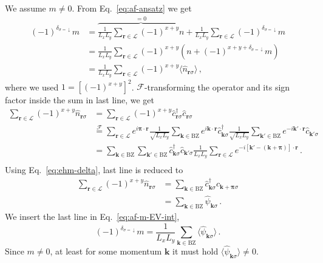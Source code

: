 \begin{tabproof}
	
	We assume $m \neq 0$. From Eq.~\eqref{eq:af-ansatz} we get
	\begin{align}
		(-1)^{\delta_{\sigma=\downarrow}} m &=  \overbrace{\frac{1}{L_x L_y} \sum_{\mathbf{r}\in\mathcal{L}} (-1)^{x+y} n}^{=0} + \frac{1}{L_x L_y} \sum_{\mathbf{r}\in\mathcal{L}} (-1)^{\delta_{\sigma=\downarrow}} m \nonumber \\
		&= \frac{1}{L_x L_y} \sum_{\mathbf{r}\in\mathcal{L}} (-1)^{x+y} \left(
		n + (-1)^{x+y+\delta_{\sigma=\downarrow}} m
		\right) \nonumber \\
		&= \frac{1}{L_x L_y} \sum_{\mathbf{r}\in\mathcal{L}} (-1)^{x+y} \langle \hat n_{\mathbf{r}\sigma} \rangle \, , \label{eq:af-m-EV-int}
	\end{align}
	where we used $1 = \left[(-1)^{x+y}\right]^2$. $\mathcal{F}$-transforming the operator and its sign factor inside the sum in last line, we get
	\[
	\begin{aligned}
		\sum_{\mathbf{r}\in\mathcal{L}} (-1)^{x+y} \hat n_{\mathbf{r}\sigma} &= \sum_{\mathbf{r}\in\mathcal{L}} (-1)^{x+y} \hat c_{\mathbf{r}\sigma}^\dagger \hat c_{\mathbf{r}\sigma} \\
		&\stackrel{\mathcal{F}}{=} \sum_{\mathbf{r}\in\mathcal{L}} e^{i \bm{\pi} \cdot \mathbf{r}}
		\frac{1}{\sqrt{L_x L_y}} \sum_{\mathbf{k} \in \mathrm{BZ}} e^{i \mathbf{k} \cdot \mathbf{r}} \hat c_{\mathbf{k}\sigma}^\dagger \frac{1}{\sqrt{L_x L_y}} \sum_{\mathbf{k}' \in \mathrm{BZ}} e^{-i \mathbf{k}' \cdot \mathbf{r}} \hat c_{\mathbf{k}'\sigma} \\
		&=\sum_{\mathbf{k} \in \mathrm{BZ}} \sum_{\mathbf{k}' \in \mathrm{BZ}} \hat c_{\mathbf{k}\sigma}^\dagger \hat c_{\mathbf{k}'\sigma} \frac{1}{L_x L_y} \sum_{\mathbf{r}\in\mathcal{L}} e^{-i [\mathbf{k}' - (\mathbf{k} + \bm{\pi}) ] \cdot \mathbf{r}} \, . \\
	\end{aligned}	
	\]
	Using Eq.~\eqref{eq:ehm-delta}, last line is reduced to
	\begin{align}
		\sum_{\mathbf{r}\in\mathcal{L}} (-1)^{x+y} \hat n_{\mathbf{r}\sigma} &= \sum_{\mathbf{k} \in \mathrm{BZ}} \hat c_{\mathbf{k}\sigma}^\dagger \hat c_{\mathbf{k}+\bm{\pi}\sigma} \label{eq:af-<psi>-not0-int} \\
		&= \sum_{\mathbf{k} \in \mathrm{BZ}} \hat \psi_{\mathbf{k}\sigma} \, . \label{eq:af-<psi>-not0}
	\end{align}
	We insert the last line in Eq.~\eqref{eq:af-m-EV-int},
	\begin{equation}\label{eq:af-m-EV}
		(-1)^{\delta_{\sigma=\downarrow}} m = \frac{1}{L_x L_y} \sum_{\mathbf{k} \in \mathrm{BZ}} \langle \hat \psi_{\mathbf{k}\sigma} \rangle \, .
	\end{equation}
	Since $m \neq 0$, at least for some momentum $\mathbf{k}$ it must hold $\langle \hat \psi_{\mathbf{k}\sigma} \rangle \neq 0$.
\end{tabproof}

